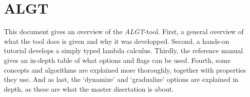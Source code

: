 \section{ALGT}\label{algt}

This document gives an overview of the \emph{ALGT}-tool. First, a
general overview of what the tool does is given and why it was
developped. Second, a hands-on tutorial develops a simply typed lambda
calculus. Thirdly, the reference manual gives an in-depth table of what
options and flags can be used. Fourth, some concepts and algorithms are
explained more thoroughly, together with properties they use. And as
last, the `dynamize' and `gradualize' options are explained in depth, as
these are what the master disertation is about.
